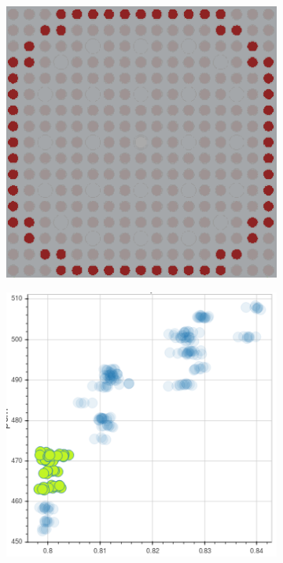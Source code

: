 \documentclass[12pt,twoside]{mitthesis-exec}
\begin{document}
\begin{figure}[h!]
\centering
\begin{subfigure}{0.45\textwidth}
  \centering
  \includegraphics[width=0.9\linewidth]{figures/unsupervised/features/assm-16/u238-capt/mean-pcm/geometry-2}
  \caption{}
  \label{fig:chap10-capt-mean-pcm-geom-2}
\end{subfigure}%
\begin{subfigure}{0.45\textwidth}
  \centering
  \includegraphics[width=0.9\linewidth]{figures/unsupervised/features/assm-16/u238-capt/mean-pcm/mgxs-2}

\end{subfigure}
\end{figure}
\end{document}
